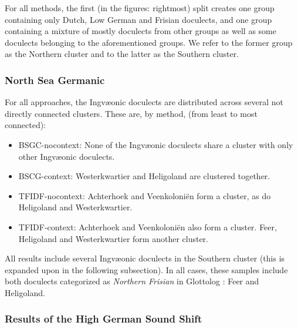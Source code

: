 \documentclass[a4paper]{article}
\begin{document}
For all methods, the first (in the figures: rightmost) split
creates one group containing only Dutch, Low German and Frisian doculects,
and one group containing a mixture of mostly doculects from other groups
as well as some doculects belonging to the aforementioned groups.
We refer to the former group as the Northern cluster and to the
latter as the Southern cluster.


\subsubsection{North Sea Germanic}

For all approaches, the Ingv\ae{}onic doculects
are distributed across several not directly connected clusters.
These are, by method, (from least to most connected):

\begin{itemize}
\item
BSGC-nocontext:
None of the Ingv\ae{}onic doculects share a cluster
with only other Ingv\ae{}onic doculects.

\item
BSCG-context:
Westerkwartier and Heligoland are clustered together.

\item
TFIDF-nocontext:
Achterhoek and Veenkoloni\"{e}n form a cluster,
as do Heligoland and Westerkwartier.

\item
TFIDF-context:
Achterhoek and Veenkoloni\"{e}n also form a cluster.
Feer, Heligoland and Westerkwartier form another cluster.
\end{itemize}

All results include several Ingv\ae{}onic doculects
in the Southern cluster
(this is expanded upon in the following subsection).
In all cases, these
samples include both doculects categorized as \textit{Northern Frisian}
in Glottolog \citep{hammarstroem2018glottolog}: Feer and Heligoland.


\subsubsection{Results of the High German Sound Shift}
\end{document}
